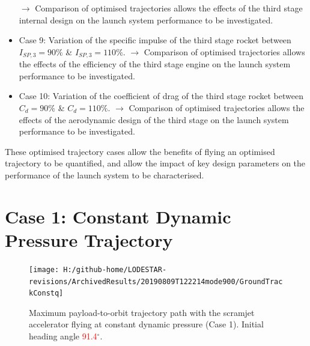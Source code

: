 \begin{itemize}
	\newline$\rightarrow$ Comparison of optimised trajectories allows the effects of the third stage internal design on the launch system performance to be investigated. 
	\item Case 9: Variation of the specific impulse of the third stage rocket between $I_{SP,3} = 90\%$ \& $I_{SP,3} = 110\%$. 
	\newline$\rightarrow$ Comparison of optimised trajectories allows the effects of the efficiency of the third stage engine on the launch system performance to be investigated. 
	\item Case 10: Variation of the coefficient of drag of the third stage rocket between $C_d = 90\%$ \& $C_d = 110\%$.
	\newline$\rightarrow$ Comparison of optimised trajectories allows the effects of the aerodynamic design of the third stage on the launch system performance to be investigated.
\end{itemize}
These optimised trajectory cases allow the benefits of flying an optimised trajectory to be quantified, and allow the impact of key design parameters on the performance of the launch system to be characterised. 
  

\section{Case 1: Constant Dynamic Pressure Trajectory}

\begin{figure}[ht]%
	\centering
	\texttt{[image: H:/github-home/LODESTAR-revisions/ArchivedResults/20190809T122214mode900/GroundTrackConstq]}
	\caption{Maximum payload-to-orbit trajectory path with the scramjet accelerator flying at constant dynamic pressure (Case 1). Initial heading angle \textcolor{red}{91.4}$^\circ$.}
	\label{fig:GroundTrackConstq}
\end{figure}

